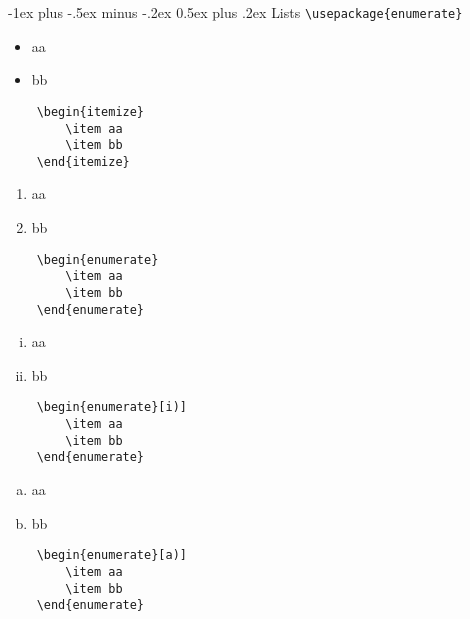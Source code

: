 \documentclass[a4paper,10pt,landscape]{article}
\makeatletter
\renewcommand{\section}{\@startsection{section}{1}{0mm}%
                                {-1ex plus -.5ex minus -.2ex}%
                                {0.5ex plus .2ex}%
                                {\normalfont\large\bfseries}}
\theoremstyle{definition}
\theoremstyle{remark}
\makeatother
\begin{document}
\begin{multicols}{3}
\section{Lists}
\verb!\usepackage{enumerate}!
\begin{multicols}{2}
	\begin{itemize}
		\item aa
		\item bb
	\end{itemize}
\columnbreak
	\begin{verbatim}
	\begin{itemize}
		\item aa
		\item bb
	\end{itemize}
	\end{verbatim}
\end{multicols}
\begin{multicols}{2}
	\begin{enumerate}
		\item aa
		\item bb
	\end{enumerate}
\columnbreak
	\begin{verbatim}
	\begin{enumerate}
		\item aa
		\item bb
	\end{enumerate}
	\end{verbatim}
\end{multicols}
\begin{multicols}{2}
	\begin{enumerate}[i)]
		\item aa
		\item bb
	\end{enumerate}
\columnbreak
	\begin{verbatim}
	\begin{enumerate}[i)]
		\item aa
		\item bb
	\end{enumerate}
	\end{verbatim}
\end{multicols}
\begin{multicols}{2}
	\begin{enumerate}[a)]
		\item aa
		\item bb
	\end{enumerate}
\columnbreak
	\begin{verbatim}
	\begin{enumerate}[a)]
		\item aa
		\item bb
	\end{enumerate}
	\end{verbatim}
\end{multicols}





\end{multicols}
\end{document}
